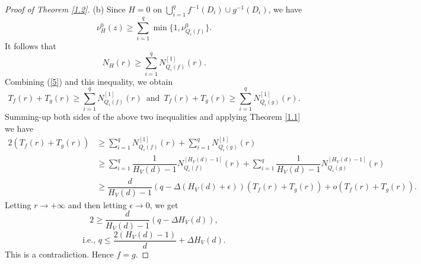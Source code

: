 \documentclass[10pt,a4paper]{amsart}
\begin{document}
\begin{proof}[Proof of Theorem \ref{1.2}]
(b) Since $H=0$ on $\bigcup_{i=1}^qf^{-1}(D_i)\cup g^{-1}(D_i)$, we have
$$\nu^0_H(z)\ge \sum_{i=1}^q\min\{1,\nu^0_{Q_i(f)}\}.$$
It follows that
$$N_H(r)\ge \sum_{i=1}^qN^{[1]}_{Q_i(f)}(r).$$
Combining (\ref{5}) and this inequality, we obtain
$$ T_f(r)+T_g(r) \ge \sum_{i=1}^qN^{[1]}_{Q_i(f)}(r)\, \text{ and }\, T_f(r)+T_g(r) \ge \sum_{i=1}^qN^{[1]}_{Q_i(g)}(r).$$
Summing-up both sides of the above two inequalities and applying Theorem \ref{1.1} we have
\begin{align*}
2(T_f(r)+T_g(r))&\ge\sum_{i=1}^qN^{[1]}_{Q_i(f)}(r)+\sum_{i=1}^qN^{[1]}_{Q_i(g)}(r)\\
&\ge \sum_{i=1}^q\dfrac{1}{H_V(d)-1}N^{[H_V(d)-1]}_{Q_i(f)}(r)+\sum_{i=1}^q\dfrac{1}{H_V(d)-1}N^{[H_V(d)-1]}_{Q_i(g)}(r)\\
&\ge \dfrac{d}{H_V(d)-1}(q-\Delta (H_V(d)+\epsilon))(T_f(r)+T_g(r))+o(T_f(r)+T_g(r)).
\end{align*}
Letting $r\longrightarrow +\infty$ and then letting $\epsilon\longrightarrow 0$, we get 
$$2 \ge \dfrac{d}{H_V(d)-1}(q-\Delta H_V(d)),$$
$$\text{i.e., } q\le \frac{2(H_V(d)-1)}{d}+\Delta H_V(d).$$
This is a contradiction.
Hence $f=g$.
\end{proof}
\end{document}
